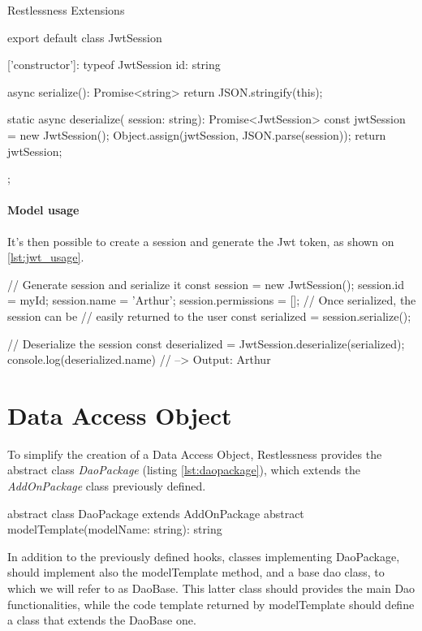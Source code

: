 \begin{chapter}{Restlessness Extensions}
    \bigskip
    \begin{code}[caption=A JwtSession class created by the auth-jwt package, label={lst:new_model_auth}]
export default class JwtSession {
  ['constructor']: typeof JwtSession
  id: string

  async serialize(): Promise<string> {
    return JSON.stringify(this);
  }

  static async deserialize(
      session: string): Promise<JwtSession> {
    const jwtSession = new JwtSession();
    Object.assign(jwtSession, JSON.parse(session));
    return jwtSession;
  }
};
    \end{code}

    \paragraph{Model usage}
    It's then possible to create a session and generate the Jwt token, as shown
    on \ref{lst:jwt_usage}.

    \bigskip
    \begin{code}[caption=User model usage, label={lst:jwt_usage}]
// Generate session and serialize it
const session = new JwtSession();
session.id = myId;
session.name = 'Arthur';
session.permissions = [];
// Once serialized, the session can be
// easily returned to the user
const serialized = session.serialize();

// Deserialize the session
const deserialized = JwtSession.deserialize(serialized);
console.log(deserialized.name) // --> Output: Arthur
    \end{code}

    \section{Data Access Object}
    \label{sec:data_access_object}

    To simplify the creation of a Data Access Object, Restlessness provides the
    abstract class \textit{DaoPackage} (listing \ref{lst:daopackage}), which extends
    the \textit{AddOnPackage} class previously defined.

    \bigskip
    \begin{code}[caption=DaoPackage class definition, label={lst:daopackage}]
abstract class DaoPackage extends AddOnPackage {
    abstract modelTemplate(modelName: string): string
}
    \end{code}

    In addition to the previously defined hooks, classes implementing DaoPackage,
    should implement also the modelTemplate method, and a base dao class, to which
    we will refer to as DaoBase. This latter class should provides the main Dao
    functionalities, while the code template returned by modelTemplate should define
    a class that extends the DaoBase one.


\end{chapter}
